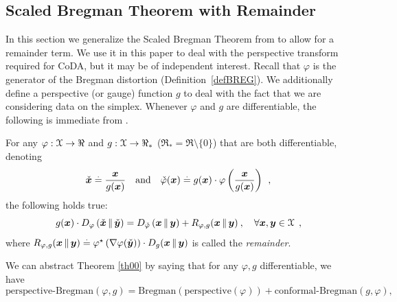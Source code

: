 \documentclass{article}
\begin{document}
\subsection{Scaled Bregman Theorem with Remainder}

In this section we generalize the Scaled Bregman Theorem from \cite[Theorem 1]{nmoAS}
to allow for a remainder term.
We use it in this paper to deal with the perspective transform required for CoDA,
but it may be of independent interest. Recall that $\varphi$ is the generator
of the Bregman distortion (Definition~\ref{defBREG}). We additionally define
a perspective (or gauge) function $g$ to deal with the fact that we are considering
data on the simplex.
Whenever $\varphi$ and $g$ are differentiable, the following is
immediate from \cite[Theorem 1]{nmoAS}.
\begin{mdframed}[style=MyFrame]
\begin{theorem}\label{th00}
For any
$\varphi: \mathcal{X} \rightarrow \Re$ and $g : \mathcal{X} \rightarrow \Re_*$ ($\Re_*=\Re\setminus\{0\}$)
that are both differentiable, denoting
\begin{equation}
  \check{\bm{x}} \stackrel{\mathrm{.}}{=} \frac{\bm{x}}{g(\bm{x})}
  \quad\text{and}\quad
  \check{\varphi}(\bm{x}) \stackrel{\mathrm{.}}{=}
  g(\bm{x}) \cdot {\varphi}\left( \frac{\bm{x}}{g(\bm{x})} \right) \:\:,\label{defCHECKPHI}
\end{equation}
the following holds true:
  \begin{equation}
  g(\bm{x}) \cdot D_{\varphi}\left( \check{\bm{x}} \,\Vert\, \check{\bm{y}} \right)
  = D_{\check{\varphi}}\left( \bm{x} \,\Vert\, \bm{y}\right)
  + R_{\varphi, g}(\bm{x}\,\Vert\,\bm{y})\:,\quad\forall
  \bm{x}, \bm{y}\in \mathcal{X}\:\:,\label{defdagger}
  \end{equation}
  where $R_{\varphi, g}(\bm{x}\,\Vert\,\bm{y}) \stackrel{\mathrm{.}}{=} \varphi^\star\left(\nabla\varphi(\check{\bm{y}})
  \right)\cdot D_g(\bm{x}\,\Vert\,\bm{y})$ is called the \emph{remainder}.
\end{theorem}
\end{mdframed}
We can abstract Theorem \ref{th00} by saying that for any $\varphi, g$
differentiable, we have
\begin{equation*}
\mathrm{perspective\text{-}Bregman}(\varphi, g)
=
\mathrm{Bregman}(\mathrm{perspective}(\varphi))
+ \mathrm{conformal\text{-}Bregman}(g, \varphi),
\end{equation*}
\end{document}
